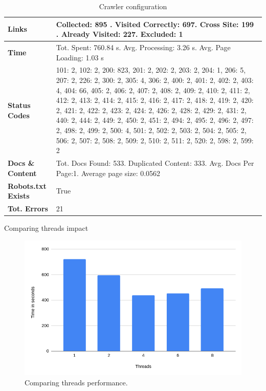 {\begin{table}[ht] 
{\footnotesize
\begin{tabular}{ P{3cm} ||P{10.1cm}  }      %
 \hline \hline
\textbf{Links} & Collected: 895 . Visited Correctly: 697. Cross Site: 199 . Already Visited: 227. Excluded: 1\T\B 
\\ 
\hline
\textbf{Time} & Tot. Spent: 760.84 s. Avg. Processing: 3.26 s. Avg. Page Loading: 1.03 s\T\B 
\\
\hline
\textbf{Status Codes} &     101: 2, 102: 2, 200: 823, 201: 2, 202: 2, 203: 2, 204: 1, 206: 5, 207: 2, 226: 2, 300: 2, 305: 4, 306: 2, 400: 2, 401: 2, 402: 2, 403: 4, 404: 66, 405: 2, 406: 2, 407: 2, 408: 2, 409: 2, 410: 2, 411: 2, 412: 2, 413: 2, 414: 2, 415: 2, 416: 2, 417: 2, 418: 2, 419: 2, 420: 2, 421: 2, 422: 2, 423: 2, 424: 2, 426: 2, 428: 2, 429: 2, 431: 2, 440: 2, 444: 2, 449: 2, 450: 2, 451: 2, 494: 2, 495: 2, 496: 2, 497: 2, 498: 2, 499: 2, 500: 4, 501: 2, 502: 2, 503: 2, 504: 2, 505: 2, 506: 2, 507: 2, 508: 2, 509: 2, 510: 2, 511: 2, 520: 2, 598: 2, 599: 2\T\B 
\\ 
\hline
\textbf{Docs \& Content} & Tot. Docs Found: 533. Duplicated Content: 333. Avg. Docs Per Page:1. Average page size: 0.0562\T\B 
\\ 
\hline
\textbf{Robots.txt Exists} & True\T\B 
\\ 
\hline
\textbf{Tot. Errors} & 21\T\B 
\\ 
\hline \hline
    \end{tabular}
}
  \captionsetup{justification=centering,margin=2cm}
  \caption{Crawler configuration}
\end{table}


Comparing threads impact

\begin{figure}[h]	
     \centering
     \includegraphics[width=13cm]{images/threads-table.png}
     \caption{Comparing threads performance.}
     \label{fig:google-arch}
\end{figure}

}
